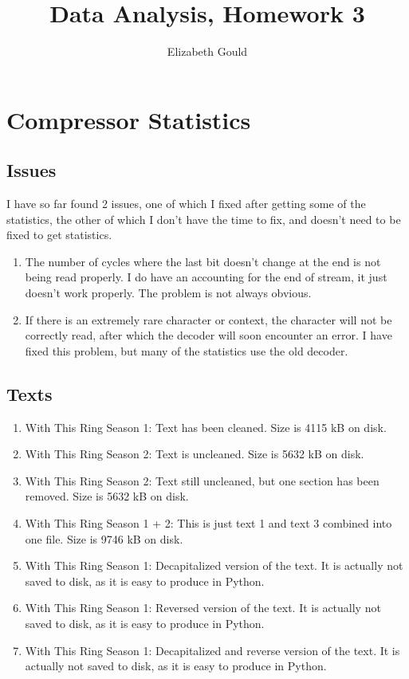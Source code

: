 \documentclass{article}
\title{Data Analysis, Homework 3}
\author{Elizabeth Gould}
\begin{document}
\maketitle

\section{Compressor Statistics}

\subsection{Issues}

I have so far found 2 issues, one of which I fixed after getting some of the statistics, the other of which I don't have the time to fix, and doesn't need to be fixed to get statistics.
\begin{enumerate}
\item The number of cycles where the last bit doesn't change at the end is not being read properly. I do have an accounting for the end of stream, it just doesn't work properly. The problem is not always obvious. 
\item If there is an extremely rare character or context, the character will not be correctly read, after which the decoder will soon encounter an error. I have fixed this problem, but many of the statistics use the old decoder. 
\end{enumerate}

\subsection{Texts} 

\begin{enumerate}
\item With This Ring Season 1: Text has been cleaned. Size is 4115 kB on disk. 
\item With This Ring Season 2: Text is uncleaned. Size is 5632 kB on disk.
\item With This Ring Season 2: Text still uncleaned, but one section has been removed. Size is 5632 kB on disk.
\item With This Ring Season 1 + 2: This is just text 1 and text 3 combined into one file. Size is 9746 kB on disk.
\item With This Ring Season 1: Decapitalized version of the text. It is actually not saved to disk, as it is easy to produce in Python.
\item With This Ring Season 1: Reversed version of the text. It is actually not saved to disk, as it is easy to produce in Python.
\item With This Ring Season 1: Decapitalized and reverse version of the text. It is actually not saved to disk, as it is easy to produce in Python.


\end{enumerate}
\end{document}
